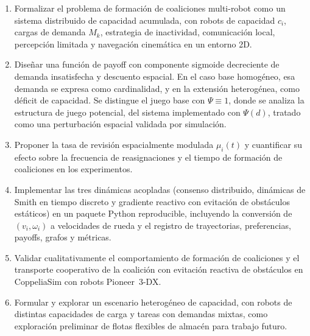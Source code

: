 \begin{enumerate}
  \item Formalizar el problema de formación de coaliciones multi-robot como un
    sistema distribuido de capacidad acumulada, con robots de capacidad $c_i$,
    cargas de demanda $M_k$, estrategia de inactividad, comunicación local,
    percepción limitada y navegación cinemática en un entorno 2D.

  \item Diseñar una función de payoff con componente sigmoide decreciente de
    demanda insatisfecha y descuento espacial. En el caso base homogéneo, esa demanda
    se expresa como cardinalidad, y en la extensión heterogénea, como déficit de
    capacidad. Se distingue el juego base con $\Psi\equiv1$, donde se analiza la
    estructura de juego potencial, del sistema implementado con $\Psi(d)$, tratado como
    una perturbación espacial validada por simulación.

  \item Proponer la tasa de revisión espacialmente modulada $\mu_i(t)$ y
    cuantificar su efecto sobre la frecuencia de reasignaciones y el tiempo de
    formación de coaliciones en los experimentos.

  \item Implementar las tres dinámicas acopladas (consenso distribuido,
    dinámicas de Smith en tiempo discreto y gradiente reactivo con evitación de obstáculos
    estáticos) en un paquete Python reproducible, incluyendo la conversión de
    $(v_i,\omega_i)$ a velocidades de rueda y el registro de trayectorias, preferencias,
    payoffs, grafos y métricas.

  \item Validar cualitativamente el comportamiento de formación de coaliciones y el
    transporte cooperativo de la coalición con evitación reactiva de obstáculos en
    CoppeliaSim con robots Pioneer~3-DX.

  \item Formular y explorar un escenario heterogéneo de capacidad, con robots de
    distintas capacidades de carga y tareas con demandas mixtas, como exploración
    preliminar de flotas flexibles de almacén para trabajo futuro.
\end{enumerate}
